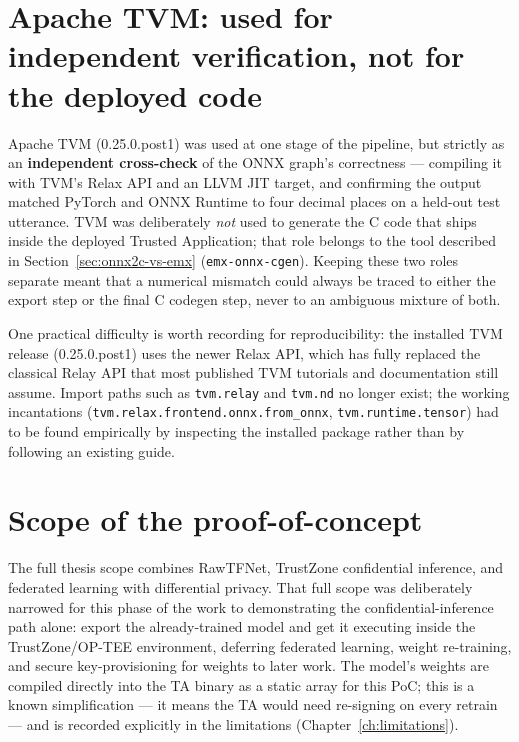 \documentclass[11pt,a4paper]{report}
\newcommand{\code}[1]{\texttt{\small #1}}
\begin{document}
\section{Apache TVM: used for independent verification, not for the deployed code}

Apache TVM (0.25.0.post1) was used at one stage of the pipeline, but strictly as an
\textbf{independent cross-check} of the ONNX graph's correctness --- compiling it with TVM's Relax
API and an LLVM JIT target, and confirming the output matched PyTorch and ONNX Runtime to four
decimal places on a held-out test utterance. TVM was deliberately \emph{not} used to generate the
C code that ships inside the deployed Trusted Application; that role belongs to the tool described
in Section~\ref{sec:onnx2c-vs-emx} (\code{emx-onnx-cgen}). Keeping these two roles separate meant
that a numerical mismatch could always be traced to either the export step or the final C codegen
step, never to an ambiguous mixture of both.

One practical difficulty is worth recording for reproducibility: the installed TVM release
(0.25.0.post1) uses the newer Relax API, which has fully replaced the classical Relay API that most
published TVM tutorials and documentation still assume. Import paths such as \code{tvm.relay} and
\code{tvm.nd} no longer exist; the working incantations
(\code{tvm.relax.frontend.onnx.from\_onnx}, \code{tvm.runtime.tensor}) had to be found empirically
by inspecting the installed package rather than by following an existing guide.

\section{Scope of the proof-of-concept}

The full thesis scope combines RawTFNet, TrustZone confidential inference, and federated learning
with differential privacy. That full scope was deliberately narrowed for this phase of the work to
demonstrating the confidential-inference path alone: export the already-trained model and get it
executing inside the TrustZone/OP-TEE environment, deferring federated learning, weight
re-training, and secure key-provisioning for weights to later work. The model's weights are
compiled directly into the TA binary as a static array for this PoC; this is a known simplification
--- it means the TA would need re-signing on every retrain --- and is recorded explicitly in the
limitations (Chapter~\ref{ch:limitations}).
\end{document}
